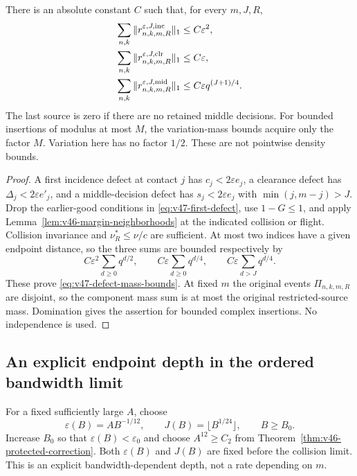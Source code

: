 \begin{proposition}
\label{prop:v47-first-defect-masses}
There is an absolute constant $C$ such that, for every $m,J,R$,
\begin{align}
 \sum_{n,k}\|r^{\varepsilon,J,\mathrm{inc}}_{n,k,m,R}\|_1
     &\le C\varepsilon^2,\notag\\
 \sum_{n,k}\|r^{\varepsilon,J,\mathrm{clr}}_{n,k,m,R}\|_1
     &\le C\varepsilon,\notag\\
 \sum_{n,k}\|r^{\varepsilon,J,\mathrm{mid}}_{n,k,m,R}\|_1
     &\le C\varepsilon q^{(J+1)/4}.
                                      \label{eq:v47-defect-mass-bounds}
\end{align}
The last source is zero if there are no retained middle decisions.
For bounded insertions of modulus at most $M$, the variation-mass
bounds acquire only the factor $M$. Variation here has no factor
$1/2$. These are not pointwise density bounds.
\end{proposition}
\begin{proof}
A first incidence defect at contact $j$ has
$c_j<2\varepsilon e_j$, a clearance defect has
$\Delta_j<2\varepsilon e'_j$, and a middle-decision defect has
$s_j<2\varepsilon e_j$ with $\min(j,m-j)>J$.
Drop the earlier-good conditions in \eqref{eq:v47-first-defect}, use
$1-G\le1$, and apply Lemma~\ref{lem:v46-margin-neighborhoods}
at the indicated collision or flight. Collision invariance and
$\nu_R^*\le\nu/c$ are sufficient. At most two indices have a given
endpoint distance, so the three sums are bounded respectively by
\[
 C\varepsilon^2\sum_{d\ge0}q^{d/2},\qquad
 C\varepsilon\sum_{d\ge0}q^{d/4},\qquad
 C\varepsilon\sum_{d>J}q^{d/4}.
\]
These prove \eqref{eq:v47-defect-mass-bounds}. At fixed $m$ the
original events $\Pi_{n,k,m,R}$ are disjoint, so the component mass
sum is at most the original restricted-source mass. Domination gives
the assertion for bounded complex insertions. No independence is used.
\end{proof}

\subsection{An explicit endpoint depth in the ordered bandwidth limit}
For a fixed sufficiently large $A$, choose
\begin{equation}\label{eq:v47-ordered-endpoint-depth}
 \varepsilon(B)=A B^{-1/12},\qquad
 J(B)=\lfloor B^{1/24}\rfloor,\qquad B\ge B_0.
\end{equation}
Increase $B_0$ so that $\varepsilon(B)<\varepsilon_0$ and choose
$A^{12}\ge C_2$ from Theorem~\ref{thm:v46-protected-correction}.
Both $\varepsilon(B)$ and $J(B)$ are fixed before the collision limit.
This is an explicit bandwidth-dependent depth, not a rate depending
on $m$.

